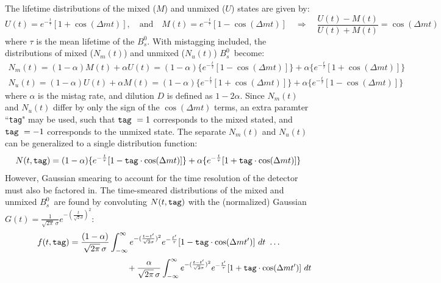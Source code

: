 \documentclass{article}
\newcommand{\Bs}{\mbox{$B_{s}^{0}$}}
\newcommand{\Tag}{\mbox{\tt tag}}
\begin{document}
The lifetime distributions of the mixed ($M$) and unmixed ($U$) states are given by:
\begin{displaymath}
	U(t) = e^{-\frac{t}{\tau}}[ 1 + \cos (\Delta m t) ], 
	\quad \mbox{and} \quad 
	M(t) = e^{-\frac{t}{\tau}}[ 1 - \cos (\Delta m t) ]
	\quad \Rightarrow \quad 
	\frac{U(t)-M(t)}{U(t)+M(t)} = \cos(\Delta m t) 
\end{displaymath}
where $\tau$ is the mean lifetime of the \Bs.  With mistagging included, the distributions of mixed ($N_{m}(t)$) and unmixed ($N_{u}(t)$) \Bs\ become:
\begin{eqnarray*}
	N_{m}(t) = (1-\alpha)M(t) + \alpha U(t) 
	= (1-\alpha)\{e^{-\frac{t}{\tau}}[1-\cos(\Delta m t)]\} 
	+ \alpha\{e^{-\frac{t}{\tau}}[1+\cos(\Delta m t)]\}
	\\
	N_{u}(t) = (1-\alpha)U(t) + \alpha M(t) 
	= (1-\alpha)\{e^{-\frac{t}{\tau}}[1+\cos(\Delta m t)]\} 
	+ \alpha\{e^{-\frac{t}{\tau}}[1-\cos(\Delta m t)]\}
\end{eqnarray*}
where $\alpha$ is the mistag rate, and dilution $D$ is defined as $1-2\alpha$.
Since $N_{m}(t)$ and $N_{u}(t)$ differ by only the sign of the $\cos(\Delta m t)$ terms, an extra paramter ``\Tag" may be used, such that $\Tag\ =1$ corresponds to the mixed stated, and  $\Tag\ =-1$ corresponds to the unmixed state. The separate $N_{m}(t)$ and $N_{u}(t)$ can be generalized to a single distribution function:
\begin{equation}
        N(t,\Tag) = (1-\alpha)\{e^{-\frac{t}{\tau}}[ 1 -\Tag\cdot \cos(\Delta m t) ]\} 
	+ \alpha\{e^{-\frac{t}{\tau}}[ 1 + \Tag\cdot \cos (\Delta m t) ]\}
\end{equation}
However, Gaussian smearing to account for the time resolution of the detector must also be factored in. The time-smeared distributions of the mixed and unmixed \Bs\ are found by convoluting $N(t,\Tag)$ with the (normalized) Gaussian $G(t)=\frac{1}{\sqrt{2\pi}\,\sigma}e^{-(\frac{t}{\sqrt{2}\sigma})^2}$:
\begin{displaymath}
        f(t,\Tag) = 
	 \frac{(1-\alpha)}{\sqrt{2\pi}\,\sigma}
	 \int_{-\infty}^{\infty}e^{-(\frac{t-t'}{\sqrt{2}\sigma})^2}
	e^{-\frac{t'}{\tau}}[ 1 -\Tag\cdot \cos(\Delta m t')]\,\,dt\,\,	\ldots
\end{displaymath}
\begin{displaymath}
	\mbox{\hspace{2in}} \,\, + \frac{\alpha}{\sqrt{2\pi}\,\sigma}
	\int_{-\infty}^{\infty}e^{-(\frac{t-t'}{\sqrt{2}\sigma})^2}
	e^{-\frac{t'}{\tau}}[ 1 +\Tag\cdot \cos(\Delta m t')]\,\,dt 
\end{displaymath}
\end{document}

